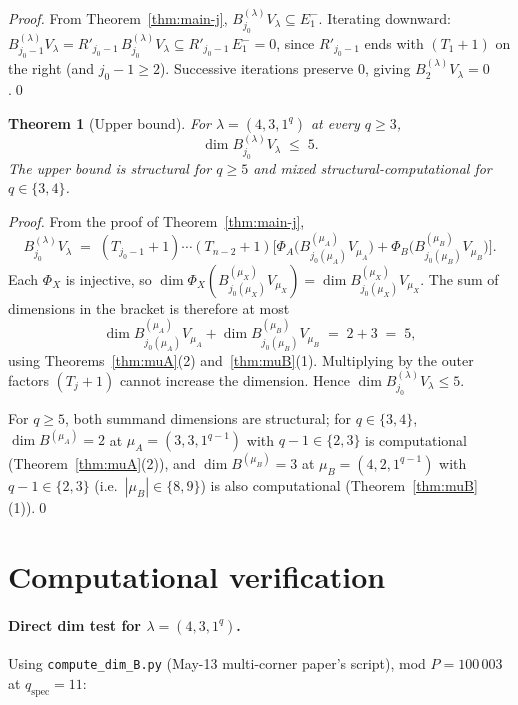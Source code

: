 \documentclass[11pt]{article}
\newtheorem{theorem}{Theorem}
\theoremstyle{definition}
\begin{document}
\begin{proof}
From Theorem~\ref{thm:main-j}, $B^{(\lambda)}_{j_0} V_\lambda \subseteq
E_1^-$. Iterating downward: $B^{(\lambda)}_{j_0 - 1} V_\lambda
= R'_{j_0-1}\, B^{(\lambda)}_{j_0} V_\lambda \subseteq R'_{j_0-1}\, E_1^-
= 0$, since $R'_{j_0-1}$ ends with $(T_1{+}1)$ on the right (and
$j_0 - 1 \ge 2$). Successive iterations preserve $0$, giving
$B^{(\lambda)}_2 V_\lambda = 0$.\qed
\end{proof}

\begin{theorem}[Upper bound]\label{thm:main-upper}
For $\lambda = (4, 3, 1^q)$ at every $q \ge 3$,
\[
   \dim B^{(\lambda)}_{j_0} V_\lambda \;\le\; 5.
\]
The upper bound is structural for $q \ge 5$ and mixed
structural-computational for $q \in \{3, 4\}$.
\end{theorem}

\begin{proof}
From the proof of Theorem~\ref{thm:main-j},
\[
   B^{(\lambda)}_{j_0} V_\lambda
   \;=\;
   (T_{j_0-1}{+}1)\cdots(T_{n-2}{+}1)
   \Big[ \Phi_A\big(B^{(\mu_A)}_{j_0(\mu_A)} V_{\mu_A}\big)
        + \Phi_B\big(B^{(\mu_B)}_{j_0(\mu_B)} V_{\mu_B}\big) \Big].
\]
Each $\Phi_X$ is injective, so
$\dim \Phi_X(B^{(\mu_X)}_{j_0(\mu_X)} V_{\mu_X}) = \dim B^{(\mu_X)}_{j_0(\mu_X)} V_{\mu_X}$.
The sum of dimensions in the bracket is therefore at most
\[
   \dim B^{(\mu_A)}_{j_0(\mu_A)} V_{\mu_A}
   + \dim B^{(\mu_B)}_{j_0(\mu_B)} V_{\mu_B}
   \;=\; 2 + 3 \;=\; 5,
\]
using Theorems~\ref{thm:muA}(2) and~\ref{thm:muB}(1).
Multiplying by the outer factors $(T_{j}{+}1)$ cannot increase the
dimension. Hence $\dim B^{(\lambda)}_{j_0} V_\lambda \le 5$.

For $q \ge 5$, both summand dimensions are structural; for
$q \in \{3, 4\}$, $\dim B^{(\mu_A)} = 2$ at $\mu_A = (3, 3, 1^{q-1})$
with $q - 1 \in \{2, 3\}$ is computational
(Theorem~\ref{thm:muA}(2)), and $\dim B^{(\mu_B)} = 3$ at
$\mu_B = (4, 2, 1^{q-1})$ with $q - 1 \in \{2, 3\}$ (i.e.\
$|\mu_B| \in \{8, 9\}$) is also computational
(Theorem~\ref{thm:muB}(1)).\qed
\end{proof}

\section{Computational verification}\label{sec:comp}

\paragraph{Direct dim test for $\lambda = (4, 3, 1^q)$.} Using
\texttt{compute\_dim\_B.py} (May-13 multi-corner paper's script),
mod $P = 100\,003$ at $q_{\text{spec}} = 11$:
\end{document}
